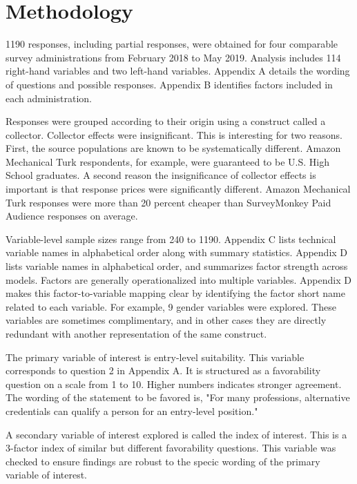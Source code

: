 \documentclass[AER]{./aea-latex-templates/AEA}
\begin{document}
        \section{Methodology}
        
        1190 responses, including partial responses, were obtained for four
        comparable survey administrations from February 2018 to May 2019.
        Analysis includes 114 right-hand variables and two left-hand variables.
        Appendix A details the wording of questions and possible responses.
        Appendix B identifies factors included in each administration.
        
        Responses were grouped according to their origin using
        a construct called a collector. Collector effects
        were insignificant. This is interesting for two reasons. First, the source
        populations are known to be systematically different. Amazon Mechanical Turk
        respondents, for example, were guaranteed to be U.S. High School graduates. A second
        reason the insignificance of collector effects is important is that
        response prices were significantly different. Amazon Mechanical Turk
        responses were more than 20 percent cheaper than SurveyMonkey Paid Audience
        responses on average.
        
        Variable-level sample sizes range from 240 to 1190. Appendix C lists
        technical variable names in alphabetical order along with summary
        statistics. Appendix D lists variable names in alphabetical order, and
        summarizes factor strength across models. Factors are generally
        operationalized into multiple variables. Appendix D makes this
        factor-to-variable mapping clear by identifying the factor short name
        related to each variable. For example, 9 gender variables were explored.
        These variables are sometimes complimentary, and in other cases they are
        directly redundant with another representation of the same construct.
        
        The primary variable of interest is entry-level suitability.
        This variable corresponds to question 2 in Appendix A.
        It is structured as a favorability question on a scale from 1 to 10. Higher numbers indicates stronger agreement.
        The wording of the statement to be favored is, "For many professions, alternative credentials can qualify a person for an entry-level position."
        
        A secondary variable of interest explored is called the index of interest.
        This is a 3-factor index of similar but different favorability questions.
        This variable was checked to ensure findings are robust to the specic wording of the primary variable of interest.
        
\end{document}
